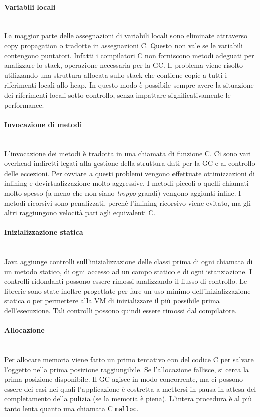 \paragraph{Variabili locali} \mbox{} \\
La maggior parte delle assegnazioni di variabili locali sono eliminate attraverso copy propagation o tradotte in assegnazioni C. Questo non vale se le variabili contengono puntatori. Infatti i compilatori C non forniscono metodi adeguati per analizzare lo stack, operazione necessaria per la GC. Il problema viene risolto utilizzando una struttura allocata sullo stack che contiene copie a tutti i riferimenti locali allo heap. In questo modo è possibile sempre avere la situazione dei riferimenti locali sotto controllo, senza impattare significativamente le performance.

\paragraph{Invocazione di metodi} \mbox{} \\
L'invocazione dei metodi è tradotta in una chiamata di funzione C. Ci sono vari overhead indiretti legati alla gestione della struttura dati per la GC e al controllo delle eccezioni. Per ovviare a questi problemi vengono effettuate ottimizzazioni di inlining e devirtualizzazione molto aggressive. I metodi piccoli o quelli chiamati molto spesso (a meno che non siano \textit{troppo} grandi) vengono aggiunti inline. I metodi ricorsivi sono penalizzati, perché l'inlining ricorsivo viene evitato, ma gli altri raggiungono velocità pari agli equivalenti C.

\paragraph{Inizializzazione statica} \mbox{} \\
Java aggiunge controlli sull'inizializzazione delle classi prima di ogni chiamata di un metodo statico, di ogni accesso ad un campo statico e di ogni istanziazione. I controlli ridondanti possono essere rimossi analizzando il flusso di controllo. Le librerie sono state inoltre progettate per fare un uso minimo dell'inizializzazione statica o per permettere alla VM di inizializzare il più possibile prima dell'esecuzione. Tali controlli possono quindi essere rimossi dal compilatore.

\paragraph{Allocazione} \mbox{} \\
Per allocare memoria viene fatto un primo tentativo con del codice C per salvare l'oggetto nella prima posizione raggiungibile. Se l'allocazione fallisce, si cerca la prima posizione disponibile. Il GC agisce in modo concorrente, ma ci possono essere dei casi nei quali l'applicazione è costretta a mettersi in pausa in attesa del completamento della pulizia (se la memoria è piena). L'intera procedura è al più tanto lenta quanto una chiamata C \texttt{malloc}. 


